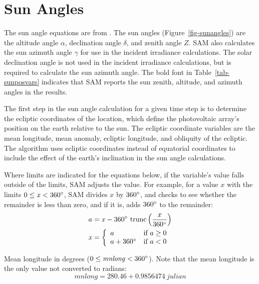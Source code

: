\documentclass[12pt,letterpaper]{article}
\begin{document}
\section{Sun Angles} \label{sec-sunangles}

The sun angle equations are from \citet{michalsky1988}. The sun angles (Figure~\ref{fig-sunangles}) are the altitude angle $\alpha$, declination angle $\delta$, and zenith angle $Z$. SAM also calculates the sun azimuth angle $\gamma$ for use in the incident irradiance calculations. The solar declination angle is not used in the incident irradiance calculations, but is required to calculate the sun azimuth angle. The bold font in Table~\ref{tab-sunposvars} indicates that SAM reports the sun zenith, altitude, and azimuth angles in the results.

The first step in the sun angle calculation for a given time step is to determine the ecliptic coordinates of the location, which define the photovoltaic array's position on the earth relative to the sun. The ecliptic coordinate variables are the mean longitude, mean anomaly, ecliptic longitude, and obliquity of the ecliptic. The algorithm uses ecliptic coordinates instead of equatorial coordinates to include the effect of the earth's inclination in the sun angle calculations.

Where limits are indicated for the equations below, if the variable's value falls outside of the limits, SAM adjusts the value. For example, for a value $x$ with the limits $0\leq\mathit{x}<360\degree$, SAM divides $x$ by $360\degree$, and checks to see whether the remainder is less than zero, and if it is, adds $360\degree$ to the remainder:
\begin{align}\label{eqn-eclipticlimits}
a &= \mathit{x} - 360\degree~\text{trunc} \left(\frac{x}{360\degree}\right)\notag\\
\mathit{x}&= \left\{
  \begin{array}{ll}
    a & \text{if $a\geq0$}\\
    a+360\degree & \text{if $a<0$}
  \end{array}
\right.
\end{align}

Mean longitude in degrees ($0\leq\mathit{mnlong}<360\degree$). Note that the mean longitude is the only value not converted to radians:
\begin{equation}\label{eqn-mnlong}
\mathit{mnlong} = 280.46 + 0.9856474~\mathit{julian}
\end{equation}
\end{document}
